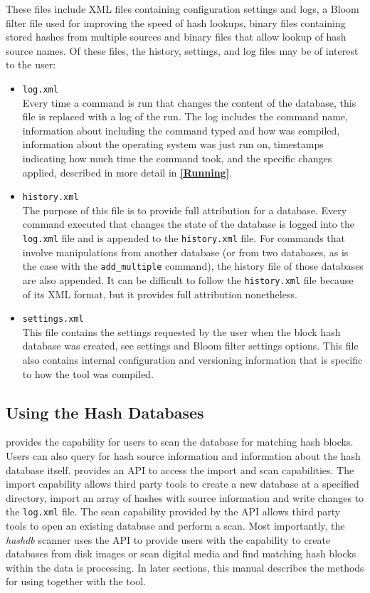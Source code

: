 \documentclass[11pt,fleqn]{article} %
\begin{document}
These files include XML files containing configuration settings and logs, a Bloom filter file used for improving the speed of hash lookups, binary files containing stored hashes from multiple sources and binary files that allow lookup of hash source names. Of these files, the history, settings, and log files may be of interest to the user:
\begin{itemize}
\item \texttt{log.xml} \\
Every time a command is run that changes the content of the database, this file is replaced with a log of the run.
The log includes the command name, information about \hash including the command typed and how \hash was compiled, information about the operating system \hash was just run on, timestamps indicating how much time the command took, and the specific \hash changes applied, described in more detail in \textbf{\autoref{Running}}.
\item \texttt{history.xml} \\
The purpose of this file is to provide full attribution for a database.
Every \hash command executed that changes the state of the database
is logged into the \texttt{log.xml} file and is appended to the \texttt{history.xml} file.
For \hash commands that involve manipulations from another database
(or from two databases, as is the case with the \texttt{add\_multiple} command),
the history file of those databases are also appended.
It can be difficult to follow the \texttt{history.xml} file because of its XML format, but it provides full attribution nonetheless.
\item \texttt{settings.xml} \\
This file contains the settings requested by the user when the block hash database was created, see \hash settings and Bloom filter settings options.
This file also contains internal \hash configuration and versioning information that is specific to how the \hash tool was compiled.
\end{itemize}



\subsection{Using the Hash Databases}
\label{usingSection}
\hash provides the capability for users to scan the database for matching hash blocks. Users can also query for hash source information and information about the hash database itself. \hash provides an API to access the import and scan capabilities.  The import capability allows third party tools to create a new database at a specified directory, import an array of hashes with source information and write changes to the \texttt{log.xml} file. The scan capability provided by the API allows third party tools to open an existing database and perform a scan. Most importantly, the \bulk \textit{hashdb} scanner uses the \hash API to provide users with the capability to create databases from disk images or scan digital media and find matching hash blocks within the data \bulk is processing. In later sections, this manual describes the methods for using \bulk together with the \hash tool. 
\end{document}
